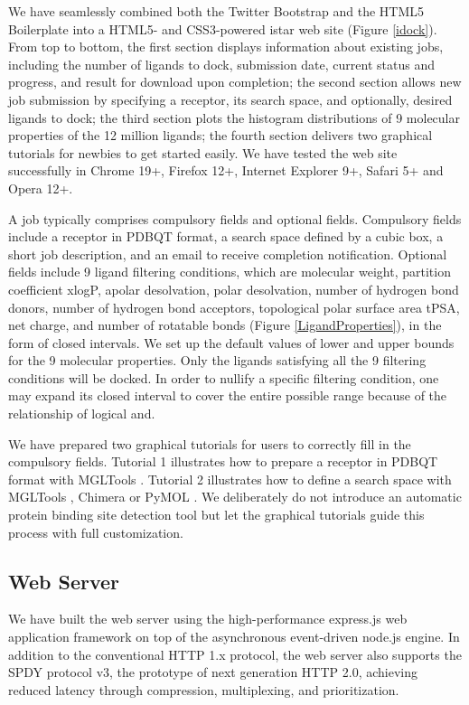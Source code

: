 \documentclass[10pt]{article}
\begin{document}
We have seamlessly combined both the Twitter Bootstrap and the HTML5 Boilerplate into a HTML5- and CSS3-powered istar web site (Figure \ref{idock}). From top to bottom, the first section displays information about existing jobs, including the number of ligands to dock, submission date, current status and progress, and result for download upon completion; the second section allows new job submission by specifying a receptor, its search space, and optionally, desired ligands to dock; the third section plots the histogram distributions of 9 molecular properties of the 12 million ligands; the fourth section delivers two graphical tutorials for newbies to get started easily. We have tested the web site successfully in Chrome 19+, Firefox 12+, Internet Explorer 9+, Safari 5+ and Opera 12+.

A job typically comprises compulsory fields and optional fields. Compulsory fields include a receptor in PDBQT format, a search space defined by a cubic box, a short job description, and an email to receive completion notification. Optional fields include 9 ligand filtering conditions, which are molecular weight, partition coefficient xlogP, apolar desolvation, polar desolvation, number of hydrogen bond donors, number of hydrogen bond acceptors, topological polar surface area tPSA, net charge, and number of rotatable bonds (Figure \ref{LigandProperties}), in the form of closed intervals. We set up the default values of lower and upper bounds for the 9 molecular properties. Only the ligands satisfying all the 9 filtering conditions will be docked. In order to nullify a specific filtering condition, one may expand its closed interval to cover the entire possible range because of the relationship of logical and.

We have prepared two graphical tutorials for users to correctly fill in the compulsory fields. Tutorial 1 illustrates how to prepare a receptor in PDBQT format with MGLTools \cite{596}. Tutorial 2 illustrates how to define a search space with MGLTools \cite{596}, Chimera \cite{1219} or PyMOL \cite{1221}. We deliberately do not introduce an automatic protein binding site detection tool but let the graphical tutorials guide this process with full customization.

\subsection*{Web Server}
We have built the web server using the high-performance express.js web application framework on top of the asynchronous event-driven node.js engine. In addition to the conventional HTTP 1.x protocol, the web server also supports the SPDY protocol v3, the prototype of next generation HTTP 2.0, achieving reduced latency through compression, multiplexing, and prioritization.
\end{document}
